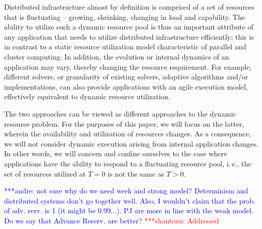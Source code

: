 \documentclass[conference,final]{IEEEtran}
\newcommand{\jhanote}[1]{ {\textcolor{red} { ***shantenu: #1 }}}
\newcommand{\alnote}[1]{ {\textcolor{blue} { ***andre: #1 }}}
\newcommand{\alnote}[1]{}
\newcommand{\jhanote}[1]{}
\begin{document}
Distributed infrastructure almost by definition is comprised of a set
of resources that is fluctuating -- growing, shrinking, changing in
load and capability.  The ability to utilize such a dynamic resource
pool is thus an important attribute of any application that needs to
utilize distributed infrastructure efficiently; this is in contrast to
a static resource utilization model characteristic of parallel and
cluster computing.  In addition, the evolution or internal dynamics of
an application may vary, thereby changing the resource requirement.
For example, different solvers, or granularity of existing solvers,
adaptive algorithms and/or implementations, can also provide
applications with an agile execution model, effectively equivalent to
dynamic resource utilization.

The two approaches can be viewed as different approaches to the
dynamic resource problem.
For the purposes of this paper, we will focus on the latter, wherein
the availability and utilization of resources changes.  As a
consequence, we will not consider dynamic execution arising from
internal application changes.  In other words, we will concern and
confine ourselves to the case where applications have the ability to
respond to a fluctuating resource pool, i.\,e., the set of resources
utilized at $T=0$ is not the same as $T>0$.

\alnote{not sure why do we need week and strong model? Determinism and
  distributed systems don't go together well. Also, I wouldn't claim
  that the prob. of adv. rerv. is 1 (it might be 0.99...). PJ are more
  in line with the weak model. Do we say that Advance Reserv. are
  better?}  \jhanote{Addressed}

\end{document}
